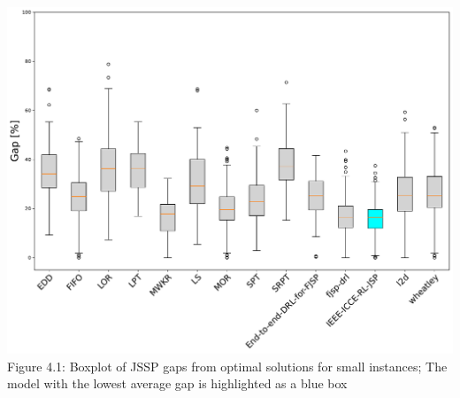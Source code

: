 \begin{center}
    \includegraphics[width=0.8\linewidth]{images/horizontal_boxplot_jssp_small.pdf}\\
    Figure 4.1: Boxplot of JSSP gaps from optimal solutions for small instances; The model with the lowest average gap is highlighted as a blue box
\end{center}

